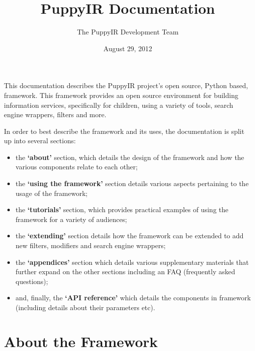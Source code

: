 \documentclass[letterpaper,10pt,english]{sphinxmanual}
\title{PuppyIR Documentation}
\date{August 29, 2012}
\author{The PuppyIR Development Team}
\begin{document}
\maketitle
\tableofcontents
{}\label{index::doc}


This documentation describes the PuppyIR project's open source, Python based, framework. This framework provides an open source environment for building information services, specifically for children, using a variety of tools, search engine wrappers, filters and more.

In order to best describe the framework and its uses, the documentation is split up into several sections:
\begin{itemize}
\item {} 
the \textbf{`about'} section, which details the design of the framework and how the various components relate to each other;

\item {} 
the \textbf{`using the framework'} section details various aspects pertaining to the usage of the framework;

\item {} 
the \textbf{`tutorials'} section, which provides practical examples of using the framework for a variety of audiences;

\item {} 
the \textbf{`extending'} section details how the framework can be extended to add new filters, modifiers and search engine wrappers;

\item {} 
the \textbf{`appendices'} section which details various supplementary materials that further expand on the other sections including an FAQ (frequently asked questions);

\item {} 
and, finally, the  \textbf{`API reference'} which details the components in framework (including details about their parameters etc).

\end{itemize}


\chapter{About the Framework}
\label{index:welcome-to-the-puppyir-framework-documentation}\label{index:about-the-framework}
\end{document}
